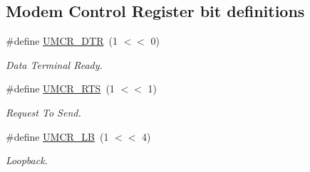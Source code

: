 \subsection*{Modem Control Register bit definitions}
\begin{DoxyCompactItemize}
\item 
\mbox{\label{group__rtl22xx__uart_gaac28bad522d92ae9db7ed52205f042f7}} 
\#define \mbox{\hyperlink{group__rtl22xx__uart_gaac28bad522d92ae9db7ed52205f042f7}{U\+M\+C\+R\+\_\+\+D\+TR}}~(1 $<$$<$ 0)
\begin{DoxyCompactList}\small\item\em Data Terminal Ready. \end{DoxyCompactList}\item 
\mbox{\label{group__rtl22xx__uart_gaaae53cfdbe0a95d52d2e6dfc58ad4485}} 
\#define \mbox{\hyperlink{group__rtl22xx__uart_gaaae53cfdbe0a95d52d2e6dfc58ad4485}{U\+M\+C\+R\+\_\+\+R\+TS}}~(1 $<$$<$ 1)
\begin{DoxyCompactList}\small\item\em Request To Send. \end{DoxyCompactList}\item 
\mbox{\label{group__rtl22xx__uart_gab2162f8bb6a4205b52233f72a2faa14c}} 
\#define \mbox{\hyperlink{group__rtl22xx__uart_gab2162f8bb6a4205b52233f72a2faa14c}{U\+M\+C\+R\+\_\+\+LB}}~(1 $<$$<$ 4)
\begin{DoxyCompactList}\small\item\em Loopback. \end{DoxyCompactList}\end{DoxyCompactItemize}
